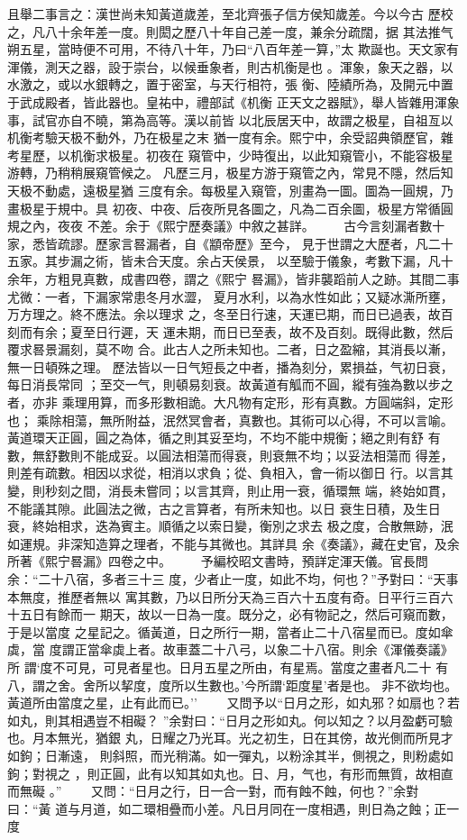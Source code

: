 \documentclass{ctexart}
\begin{document}
且舉二事言之：漢世尚未知黃道歲差，至北齊張子信方侯知歲差。今以今古 歷校之，凡八十余年差一度。則閎之歷八十年自己差一度，兼余分疏闊，据 其法推气朔五星，當時便不可用，不待八十年，乃曰``八百年差一算，''太 欺誕也。天文家有渾儀，測天之器，設于崇台，以候垂象者，則古机衡是也 。渾象，象天之器，以水激之，或以水銀轉之，置于密室，与天行相符，張 衡、陸績所為，及開元中置于武成殿者，皆此器也。皇祐中，禮部試《机衡 正天文之器賦》，舉人皆雜用渾象事，試官亦自不曉，第為高等。漢以前皆 以北辰居天中，故謂之极星，自祖亙以机衡考驗天极不動外，乃在极星之末 猶一度有余。熙宁中，余受詔典領歷官，雜考星歷，以机衡求极星。初夜在 窺管中，少時復出，以此知窺管小，不能容极星游轉，乃稍稍展窺管候之。 凡歷三月，极星方游于窺管之內，常見不隱，然后知天极不動處，遠极星猶 三度有余。每极星入窺管，別畫為一圖。圖為一圓規，乃畫极星于規中。具 初夜、中夜、后夜所見各圖之，凡為二百余圖，极星方常循圓規之內，夜夜 不差。余于《熙宁歷奏議》中敘之甚詳。 　　古今言刻漏者數十家，悉皆疏謬。歷家言晷漏者，自《顓帝歷》至今， 見于世謂之大歷者，凡二十五家。其步漏之術，皆未合天度。余占天侯景， 以至驗于儀象，考數下漏，凡十余年，方粗見真數，成書四卷，謂之《熙宁 晷漏》，皆非襲蹈前人之跡。其間二事尤微：一者，下漏家常患冬月水澀， 夏月水利，以為水性如此；又疑冰澌所壅，万方理之。終不應法。余以理求 之，冬至日行速，天運已期，而日已過表，故百刻而有余；夏至日行遲，天 運未期，而日已至表，故不及百刻。既得此數，然后覆求晷景漏刻，莫不吻 合。此古人之所未知也。二者，日之盈縮，其消長以漸，無一日頓殊之理。 歷法皆以一日气短長之中者，播為刻分，累損益，气初日衰，每日消長常同 ；至交一气，則頓易刻衰。故黃道有觚而不圓，縱有強為數以步之者，亦非 乘理用算，而多形數相詭。大凡物有定形，形有真數。方圓端斜，定形也； 乘除相蕩，無所附益，泯然冥會者，真數也。其術可以心得，不可以言喻。 黃道環天正圓，圓之為体，循之則其妥至均，不均不能中規衡；絕之則有舒 有數，無舒數則不能成妥。以圓法相蕩而得衰，則衰無不均；以妥法相蕩而 得差，則差有疏數。相因以求從，相消以求負；從、負相入，會一術以御日 行。以言其變，則秒刻之間，消長未嘗同；以言其齊，則止用一衰，循環無 端，終始如貫，不能議其隙。此圓法之微，古之言算者，有所未知也。以日 衰生日積，及生日衰，終始相求，迭為賓主。順循之以索日變，衡別之求去 极之度，合散無跡，泯如運規。非深知造算之理者，不能与其微也。其詳具 余《奏議》，藏在史官，及余所著《熙宁晷漏》四卷之中。 　　予編校昭文書時，預詳定渾天儀。官長問余：``二十八宿，多者三十三 度，少者止一度，如此不均，何也？''予對曰：``天事本無度，推歷者無以 寓其數，乃以日所分天為三百六十五度有奇。日平行三百六十五日有餘而一 期天，故以一日為一度。既分之，必有物記之，然后可窺而數，于是以當度 之星記之。循黃道，日之所行一期，當者止二十八宿星而已。度如傘虡，當 度謂正當傘虡上者。故車蓋二十八弓，以象二十八宿。則余《渾儀奏議》所 謂`度不可見，可見者星也。日月五星之所由，有星焉。當度之畫者凡二十 有八，謂之舍。舍所以挈度，度所以生數也。'今所謂`距度星'者是也。 非不欲均也。黃道所由當度之星，止有此而已。'' 　　又問予以``日月之形，如丸邪？如扇也？若如丸，則其相遇豈不相礙？ ''余對曰：``日月之形如丸。何以知之？以月盈虧可驗也。月本無光，猶銀 丸，日耀之乃光耳。光之初生，日在其傍，故光側而所見才如鉤；日漸遠， 則斜照，而光稍滿。如一彈丸，以粉涂其半，側視之，則粉處如鉤；對視之 ，則正圓，此有以知其如丸也。日、月，气也，有形而無質，故相直而無礙 。'' 　　又問：``日月之行，日一合一對，而有蝕不蝕，何也？''余對曰：``黃 道与月道，如二環相疊而小差。凡日月同在一度相遇，則日為之蝕；正一度 
\end{document}
